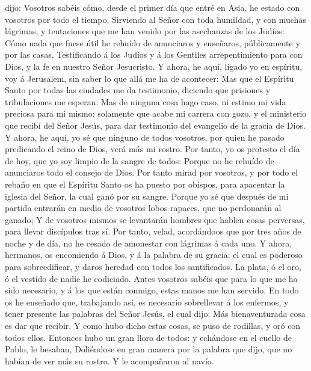 dijo: Vosotros sabéis cómo, desde el primer día que entré en Asia, he
estado con vosotros por todo el tiempo,  Sirviendo al
Señor con toda humildad, y con muchas lágrimas, y tentaciones que me han
venido por las asechanzas de los Judíos:  Cómo nada que
fuese útil he rehuído de anunciaros y enseñaros, públicamente y por las
casas,  Testificando á los Judíos y á los Gentiles
arrepentimiento para con Dios, y la fe en nuestro Señor Jesucristo.
 Y ahora, he aquí, ligado yo en espíritu, voy á
Jerusalem, sin saber lo que allá me ha de acontecer:  Mas
que el Espíritu Santo por todas las ciudades me da testimonio, diciendo
que prisiones y tribulaciones me esperan.  Mas de ninguna
cosa hago caso, ni estimo mi vida preciosa para mí mismo; solamente que
acabe mi carrera con gozo, y el ministerio que recibí del Señor Jesús,
para dar testimonio del evangelio de la gracia de Dios. 
Y ahora, he aquí, yo sé que ninguno de todos vosotros, por quien he
pasado predicando el reino de Dios, verá más mi rostro. 
Por tanto, yo os protesto el día de hoy, que yo soy limpio de la sangre
de todos:  Porque no he rehuído de anunciaros todo el
consejo de Dios.  Por tanto mirad por vosotros, y por
todo el rebaño en que el Espíritu Santo os ha puesto por obispos, para
apacentar la iglesia del Señor, la cual ganó por su sangre.
 Porque yo sé que después de mi partida entrarán en medio
de vosotros lobos rapaces, que no perdonarán al ganado; 
Y de vosotros mismos se levantarán hombres que hablen cosas perversas,
para llevar discípulos tras sí.  Por tanto, velad,
acordándoos que por tres años de noche y de día, no he cesado de
amonestar con lágrimas á cada uno.  Y ahora, hermanos, os
encomiendo á Dios, y á la palabra de su gracia: el cual es poderoso para
sobreedificar, y daros heredad con todos los santificados.
 La plata, ó el oro, ó el vestido de nadie he codiciado.
 Antes vosotros sabéis que para lo que me ha sido
necesario, y á los que están conmigo, estas manos me han servido.
 En todo os he enseñado que, trabajando así, es necesario
sobrellevar á los enfermos, y tener presente las palabras del Señor
Jesús, el cual dijo: Más bienaventurada cosa es dar que recibir.
 Y como hubo dicho estas cosas, se puso de rodillas, y
oró con todos ellos.  Entonces hubo un gran lloro de
todos: y echándose en el cuello de Pablo, le besaban, 
Doliéndose en gran manera por la palabra que dijo, que no habían de ver
más su rostro. Y le acompañaron al navío.

